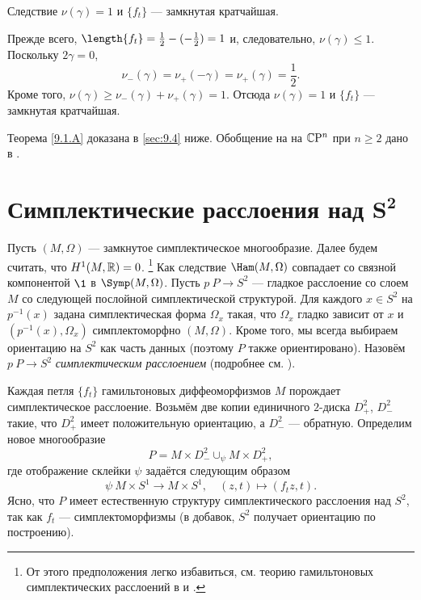 \begin{thm}[(\cite{LM2})]{Следствие} $\nu(\gamma) = 1$ и $\{f_t\}$ ---
  замкнутая кратчайшая.
\end{thm}

Прежде всего, $\length\{f_t\} =\frac12 - (-\frac12 ) = 1$ и,
следовательно, $\nu(\gamma) \le 1$. 
Поскольку $2\gamma = 0$, 
\[\nu_- (\gamma) = \nu_+ (-\gamma) = \nu_+ (\gamma) =\frac12.\]
Кроме того, $\nu(\gamma) \ge \nu_- (\gamma) + \nu_+ (\gamma) = 1$.
Отсюда $\nu(\gamma) = 1$ и $\{f_t\}$ --- замкнутая кратчайшая.

Теорема \ref{9.1.A} доказана в \ref{sec:9.4} ниже.
Обобщение на на $\mathbb{C}\mathrm{P}^n$ при $n \ge 2$ дано в \cite{P3}.

\section[\texorpdfstring{Симплектические расслоения над $S^2$}{Симплектические расслоения над S²}]{Симплектические расслоения над $\bm{S^2}$}
\label{sec:9.2}

Пусть $(M, \Omega)$ --- замкнутое симплектическое многообразие.
Далее будем считать, что $H^1 (M, \mathbb{R}) = 0$.%
\footnote{От этого предположения легко избавиться, см. теорию
  гамильтоновых симплектических расслоений в \cite{MS} и \cite{P4}.} 
Как следствие $\Ham(M, \Omega)$ совпадает со связной компонентой $\1$
в $\Symp(M, \Omega)$. 
Пусть $p \: P \to S^2$ --- гладкое расслоение со слоем $M$ со
следующей послойной симплектической структурой.
Для каждого $x \in S^2$ на $p^{-1} (x)$ задана симплектическая форма
$\Omega_x$ такая, что $\Omega_x$ гладко зависит от $x$ и $(p^{-1} (x),
\Omega_x)$  симплектоморфно $(M, \Omega)$.
Кроме того, мы всегда выбираем ориентацию на $S^2$ как часть данных
(поэтому $P$ также ориентировано).
Назовём $p\: P\to S^2$ \emph{симплектическим расслоением} (подробнее
см. \cite{MS}). 

Каждая петля $\{f_t\}$ гамильтоновых диффеоморфизмов $M$ порождает
симплектическое расслоение.
Возьмём две копии единичного $2$-диска $D_+^2$, $D_-^2$ такие, что
$D_+^2$ имеет положительную ориентацию, а $D_-^2$ --- обратную.
Определим новое многообразие
\[P =  M  \times D_-^2 \cup_\psi M \times D_+^2,\]
где отображение склейки $\psi$ задаётся следующим образом
\[\psi \: M \times S^1 \to M \times S^1,\quad (z, t) \mapsto (f_t z, t).\]
Ясно, что $P$ имеет естественную структуру симплектического расслоения
над $S^2$, так как $f_t$ --- симплектоморфизмы (в добавок, $S^2$
получает ориентацию по построению).

